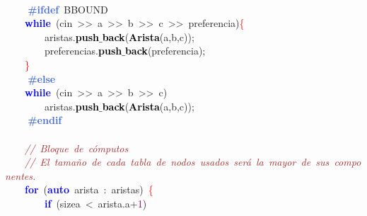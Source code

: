 \mbox{} \\
\mbox{}\textbf{\textcolor{RoyalBlue}{\ \ \ \ \#ifdef}}\ BBOUND \\
\mbox{}\ \ \ \ \textbf{\textcolor{Blue}{while}}\ \textcolor{BrickRed}{(}cin\ \textcolor{BrickRed}{\textgreater{}\textgreater{}}\ a\ \textcolor{BrickRed}{\textgreater{}\textgreater{}}\ b\ \textcolor{BrickRed}{\textgreater{}\textgreater{}}\ c\ \textcolor{BrickRed}{\textgreater{}\textgreater{}}\ preferencia\textcolor{BrickRed}{)}\textcolor{Red}{\{} \\
\mbox{}\ \ \ \ \ \ \ \ aristas\textcolor{BrickRed}{.}\textbf{\textcolor{Black}{push$\_$back}}\textcolor{BrickRed}{(}\textbf{\textcolor{Black}{Arista}}\textcolor{BrickRed}{(}a\textcolor{BrickRed}{,}b\textcolor{BrickRed}{,}c\textcolor{BrickRed}{));} \\
\mbox{}\ \ \ \ \ \ \ \ preferencias\textcolor{BrickRed}{.}\textbf{\textcolor{Black}{push$\_$back}}\textcolor{BrickRed}{(}preferencia\textcolor{BrickRed}{);} \\
\mbox{}\ \ \ \ \textcolor{Red}{\}} \\
\mbox{}\textbf{\textcolor{RoyalBlue}{\ \ \ \ \#else}} \\
\mbox{}\ \ \ \ \textbf{\textcolor{Blue}{while}}\ \textcolor{BrickRed}{(}cin\ \textcolor{BrickRed}{\textgreater{}\textgreater{}}\ a\ \textcolor{BrickRed}{\textgreater{}\textgreater{}}\ b\ \textcolor{BrickRed}{\textgreater{}\textgreater{}}\ c\textcolor{BrickRed}{)} \\
\mbox{}\ \ \ \ \ \ \ \ aristas\textcolor{BrickRed}{.}\textbf{\textcolor{Black}{push$\_$back}}\textcolor{BrickRed}{(}\textbf{\textcolor{Black}{Arista}}\textcolor{BrickRed}{(}a\textcolor{BrickRed}{,}b\textcolor{BrickRed}{,}c\textcolor{BrickRed}{));} \\
\mbox{}\textbf{\textcolor{RoyalBlue}{\ \ \ \ \#endif}} \\
\mbox{} \\
\mbox{}\ \ \ \ \textit{\textcolor{Brown}{//\ Bloque\ de\ cómputos}} \\
\mbox{}\ \ \ \ \textit{\textcolor{Brown}{//\ El\ tamaño\ de\ cada\ tabla\ de\ nodos\ usados\ será\ la\ mayor\ de\ sus\ componentes.}} \\
\mbox{}\ \ \ \ \textbf{\textcolor{Blue}{for}}\ \textcolor{BrickRed}{(}\textbf{\textcolor{Blue}{auto}}\ arista\ \textcolor{BrickRed}{:}\ aristas\textcolor{BrickRed}{)}\ \textcolor{Red}{\{} \\
\mbox{}\ \ \ \ \ \ \ \ \textbf{\textcolor{Blue}{if}}\ \textcolor{BrickRed}{(}sizea\ \textcolor{BrickRed}{\textless{}}\ arista\textcolor{BrickRed}{.}a\textcolor{BrickRed}{+}\textcolor{Purple}{1}\textcolor{BrickRed}{)} \\
